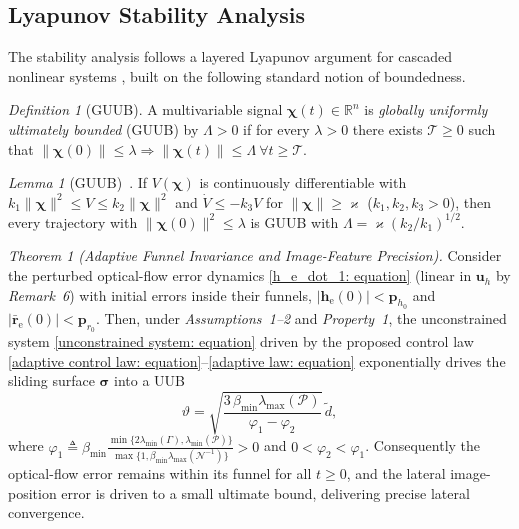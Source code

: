 \documentclass{IEEEtaes}
\begin{document}
\subsection{Lyapunov Stability Analysis} \label{stability: section}
The stability analysis follows a layered Lyapunov argument for cascaded nonlinear systems \cite{khalil2002}, built on the following standard notion of boundedness.

\textit{Definition 1} (GUUB). A multivariable signal $\boldsymbol{\chi}(t)\in\mathbb{R}^n$ is \emph{globally uniformly ultimately bounded} (GUUB) by $\Lambda>0$ if for every $\lambda>0$ there exists $\mathcal{T}\ge 0$ such that $\|\boldsymbol{\chi}(0)\|\le\lambda\Rightarrow\|\boldsymbol{\chi}(t)\|\le\Lambda\ \forall t\ge\mathcal{T}$.

\textit{Lemma 1} (GUUB)~\cite{khalil2002}. If $V(\boldsymbol{\chi})$ is continuously differentiable with $k_1\|\boldsymbol{\chi}\|^2\le V\le k_2\|\boldsymbol{\chi}\|^2$ and $\dot{V}\le -k_3 V$ for $\|\boldsymbol{\chi}\|\ge\varkappa$ ($k_1,k_2,k_3>0$), then every trajectory with $\|\boldsymbol{\chi}(0)\|^2\le\lambda$ is GUUB with $\Lambda = \varkappa(k_2/k_1)^{1/2}$.

\textit{Theorem 1 (Adaptive Funnel Invariance and Image-Feature Precision).}
Consider the perturbed optical-flow error dynamics \eqref{h_e_dot_1: equation} (linear in $\boldsymbol{u}_h$ by \textit{Remark~6}) with initial errors inside their funnels, $|\boldsymbol{h}_\text{e}(0)|<\boldsymbol{p}_{h_0}$ and $|\bar{\boldsymbol{r}}_\text{e}(0)|<\boldsymbol{p}_{r_0}$. Then, under \textit{Assumptions~1--2} and \textit{Property~1}, the unconstrained system \eqref{unconstrained system: equation} driven by the proposed control law \eqref{adaptive control law: equation}--\eqref{adaptive law: equation} exponentially drives the sliding surface $\boldsymbol{\sigma}$ into a UUB
\begin{equation} \label{UUB bound: equation}
    \vartheta = \sqrt{\frac{3\,\beta_{\min}\lambda_{\max}(\mathcal{P})}{\varphi_1-\varphi_2}}\,\tilde{d},
\end{equation}
where $\varphi_1 \triangleq \beta_{\min}\frac{\min\{2\lambda_{\min}(\Gamma),\lambda_{\min}(\mathcal{P})\}}{\max\{1,\beta_{\min}\lambda_{\max}(\mathcal{N}^{-1})\}}>0$ and $0<\varphi_2<\varphi_1$. Consequently the optical-flow error remains within its funnel for all $t\ge 0$, and the lateral image-position error is driven to a small ultimate bound, delivering precise lateral convergence.
\end{document}
